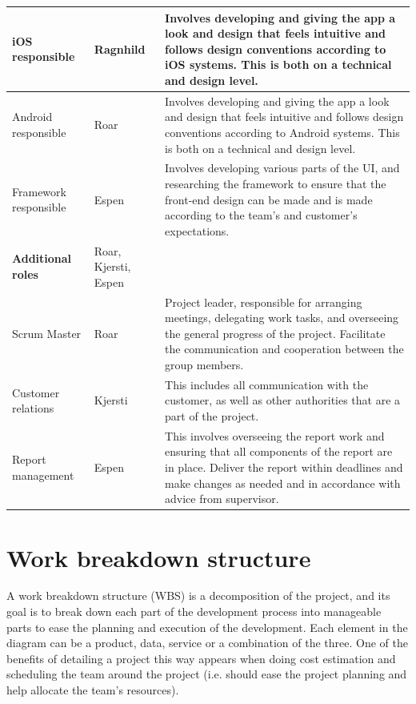 \begin{table}[!h]
\begin{adjustbox}{center}
\begin{tabular}{ | p{2.5cm} | p{2.8cm} | p{12cm} |}
			iOS responsible & Ragnhild & Involves developing and giving the app a look and design that feels intuitive and follows design conventions according to iOS systems. This is both on a technical and design level. \\ \hline
			
			Android responsible & Roar & Involves developing and giving the app a look and design that feels intuitive and follows design conventions according to Android systems. This is both on a  technical and design level. \\ \hline
			
			Framework responsible & Espen & Involves developing various parts of the UI, and researching the framework to ensure that the front-end design can be made and is made according to the team's and customer's expectations. \\ \hline
			
			\textbf{Additional roles} & Roar, Kjersti, Espen & \\ \hline
			
			Scrum Master & Roar & Project leader, responsible for arranging meetings, delegating work tasks, and overseeing the general progress of the project. Facilitate the communication and cooperation between the group members. \\ \hline
			
			Customer relations & Kjersti & This includes all communication with the customer, as well as other authorities that are a part of the project. \\ \hline
			
		
			 Report management & Espen & This involves overseeing the report work and ensuring that all components of the report are in place. Deliver the report within deadlines and make changes as needed and in accordance with advice from supervisor. \\ \hline
		\end{tabular}
	\end{adjustbox}
	\label{Tab:roles}
\end{table}

\section{Work breakdown structure}

A work breakdown structure (WBS) is a decomposition of the project, and its goal is to break down each part of the development process into manageable parts to ease the planning and execution of the development. Each element in the diagram can be a product, data, service or a combination of the three. One of the benefits of detailing a project this way appears when doing cost estimation and scheduling the team around the project (i.e. should ease the project planning and help allocate the team's resources).\newline

